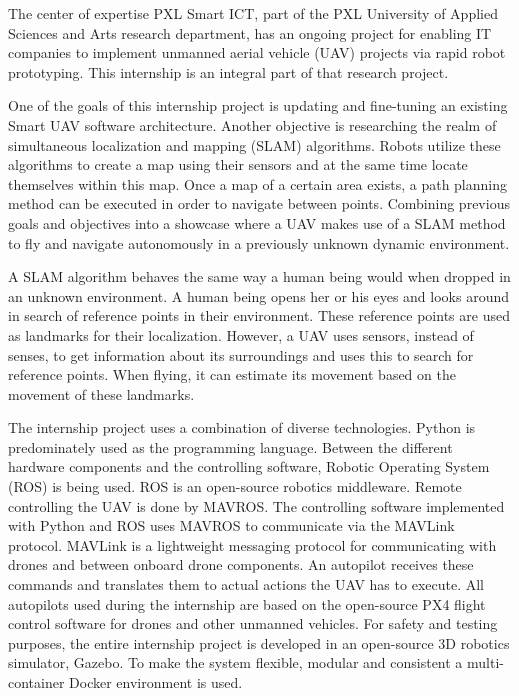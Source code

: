 The center of expertise PXL Smart ICT, part of the PXL University of Applied Sciences and Arts research department, has an ongoing project for enabling IT companies to implement unmanned aerial vehicle (UAV) projects via rapid robot prototyping. This internship is an integral part of that research project.

One of the goals of this internship project is updating and fine-tuning an existing Smart UAV software architecture. Another objective is researching the realm of simultaneous localization and mapping (SLAM) algorithms. Robots utilize these algorithms to create a map using their sensors and at the same time locate themselves within this map. Once a map of a certain area exists, a path planning method can be executed in order to navigate between points. Combining previous goals and objectives into a showcase where a UAV makes use of a SLAM method to fly and navigate autonomously in a previously unknown dynamic environment.

A SLAM algorithm behaves the same way a human being would when dropped in an unknown environment. A human being opens her or his eyes and looks around in search of reference points in their environment. These reference points are used as landmarks for their localization. However, a UAV uses sensors, instead of senses, to get information about its surroundings and uses this to search for reference points. When flying, it can estimate its movement based on the movement of these landmarks.

The internship project uses a combination of diverse technologies. Python is predominately used as the programming language. Between the different hardware components and the controlling software, Robotic Operating System (ROS) is being used. ROS is an open-source robotics middleware. Remote controlling the UAV is done by MAVROS. The controlling software implemented with Python and ROS uses MAVROS to communicate via the MAVLink protocol. MAVLink is a lightweight messaging protocol for communicating with drones and between onboard drone components. An autopilot receives these commands and translates them to actual actions the UAV has to execute. All autopilots used during the internship are based on the open-source PX4 flight control software for drones and other unmanned vehicles. For safety and testing purposes, the entire internship project is developed in an open-source 3D robotics simulator, Gazebo. To make the system flexible, modular and consistent a multi-container Docker environment is used.

